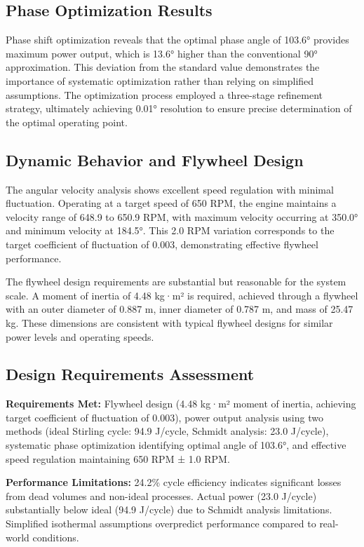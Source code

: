 \documentclass[12pt]{article}
\begin{document}
\subsection{Phase Optimization Results}
Phase shift optimization reveals that the optimal phase angle of 103.6° provides maximum power output, which is 13.6° higher than the conventional 90° approximation. This deviation from the standard value demonstrates the importance of systematic optimization rather than relying on simplified assumptions. The optimization process employed a three-stage refinement strategy, ultimately achieving 0.01° resolution to ensure precise determination of the optimal operating point.

\subsection{Dynamic Behavior and Flywheel Design}
The angular velocity analysis shows excellent speed regulation with minimal fluctuation. Operating at a target speed of 650 RPM, the engine maintains a velocity range of 648.9 to 650.9 RPM, with maximum velocity occurring at 350.0° and minimum velocity at 184.5°. This 2.0 RPM variation corresponds to the target coefficient of fluctuation of 0.003, demonstrating effective flywheel performance.

The flywheel design requirements are substantial but reasonable for the system scale. A moment of inertia of 4.48 kg·m² is required, achieved through a flywheel with an outer diameter of 0.887 m, inner diameter of 0.787 m, and mass of 25.47 kg. These dimensions are consistent with typical flywheel designs for similar power levels and operating speeds.

\subsection{Design Requirements Assessment}
\textbf{Requirements Met:} Flywheel design (4.48 kg·m² moment of inertia, achieving target coefficient of fluctuation of 0.003), power output analysis using two methods (ideal Stirling cycle: 94.9 J/cycle, Schmidt analysis: 23.0 J/cycle), systematic phase optimization identifying optimal angle of 103.6°, and effective speed regulation maintaining 650 RPM ± 1.0 RPM.

\textbf{Performance Limitations:} 24.2\% cycle efficiency indicates significant losses from dead volumes and non-ideal processes. Actual power (23.0 J/cycle) substantially below ideal (94.9 J/cycle) due to Schmidt analysis limitations. Simplified isothermal assumptions overpredict performance compared to real-world conditions.
\end{document}
